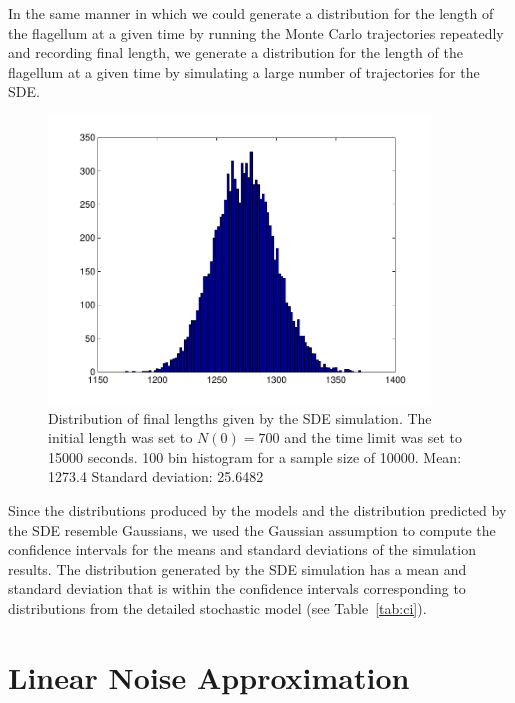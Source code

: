 \documentclass[titlepage]{article}
\begin{document}
In the same manner in which we could generate a distribution for the length of the flagellum at a given time by running the Monte Carlo trajectories repeatedly and recording final length, we generate a distribution for the length of the flagellum at a given time by simulating a large number of trajectories for the SDE.

\begin{figure}%
\centering
\includegraphics[height=3in]{SDEdist}
\caption{
Distribution of final lengths given by the SDE simulation.
The initial length was set to $N(0)=700$ and the time limit was set to 15000 seconds.
100 bin histogram for a sample size of 10000.
Mean: 1273.4
Standard deviation: 25.6482 }
\label{fig:SDEens}
\end{figure}

Since the distributions produced by the models and the distribution predicted by the SDE resemble Gaussians, we used the Gaussian assumption to compute the confidence intervals for the means and standard deviations of the simulation results.
The distribution generated by the SDE simulation has a mean and standard deviation that is within the confidence intervals corresponding to distributions from the detailed stochastic model (see Table~\ref{tab:ci}).

\section{Linear Noise Approximation}
\end{document}
